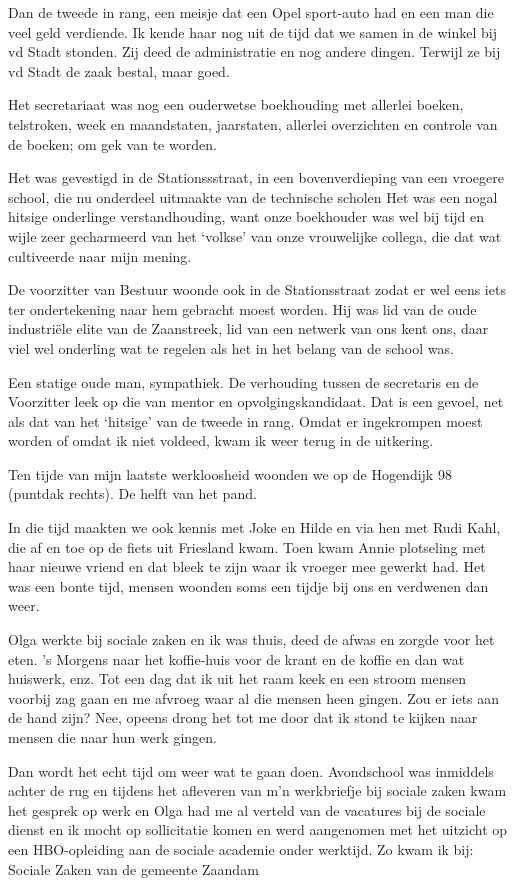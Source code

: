 \documentclass[10pt,twoside,openright]{memoir}
\begin{document}
Dan de tweede in rang, een meisje dat een Opel sport-auto had en een man die veel geld verdiende. Ik kende haar nog uit de tijd dat we samen in de winkel bij vd Stadt stonden. Zij deed de administratie en nog andere dingen. Terwijl ze bij vd Stadt de zaak bestal, maar goed.

Het secretariaat was nog een ouderwetse boekhouding met allerlei boeken, telstroken, week en maandstaten, jaarstaten, allerlei overzichten en controle van de boeken; om gek van te worden. 

Het was gevestigd in de Stationssstraat, in een bovenverdieping van een vroegere school, die nu onderdeel uitmaakte van de technische scholen Het was een nogal hitsige onderlinge verstandhouding, want onze boekhouder was wel bij tijd en wijle zeer gecharmeerd van het `volkse' van onze vrouwelijke collega, die dat wat cultiveerde naar mijn mening. 

De voorzitter van Bestuur woonde ook in de Stationsstraat zodat er wel eens iets ter ondertekening naar hem gebracht moest worden. Hij was lid van de oude industriële elite van de Zaanstreek, lid van een netwerk van ons kent ons, daar viel wel onderling wat te regelen als het in het belang van de school was. 

Een statige oude man, sympathiek. De verhouding tussen de secretaris en de Voorzitter leek op die van mentor en opvolgingskandidaat. Dat is een gevoel, net als dat van het `hitsige' van de tweede in rang. Omdat er ingekrompen moest worden of omdat ik niet voldeed, kwam ik weer terug in de uitkering.

Ten tijde van mijn laatste werkloosheid woonden we op de Hogendijk 98 (puntdak rechts). De helft van het pand.

In die tijd maakten we ook kennis met Joke en Hilde en via hen met Rudi Kahl, die af en toe op de fiets uit Friesland kwam. Toen kwam Annie plotseling met haar nieuwe vriend en dat bleek te zijn waar ik vroeger mee gewerkt had. Het was een bonte tijd, mensen woonden soms een tijdje bij ons en verdwenen dan weer. 

Olga werkte bij sociale zaken en ik was thuis, deed de afwas en zorgde voor het eten. 's Morgens naar het koffie-huis voor de krant en de koffie en dan wat huiswerk, enz. Tot een dag dat ik uit het raam keek en een stroom mensen voorbij zag gaan en me afvroeg waar al die mensen heen gingen. Zou er iets aan de hand zijn? Nee, opeens drong het tot me door dat ik stond te kijken naar mensen die naar hun werk gingen. 

Dan wordt het echt tijd om weer wat te gaan doen. Avondschool was inmiddels achter de rug en tijdens het afleveren van m'n werkbriefje bij sociale zaken kwam het gesprek op werk en Olga had me al verteld van de vacatures bij de sociale dienst en ik mocht op sollicitatie komen en werd aangenomen met het uitzicht op een HBO-opleiding aan de sociale academie onder werktijd. Zo kwam ik bij: Sociale Zaken van de gemeente Zaandam
\end{document}
